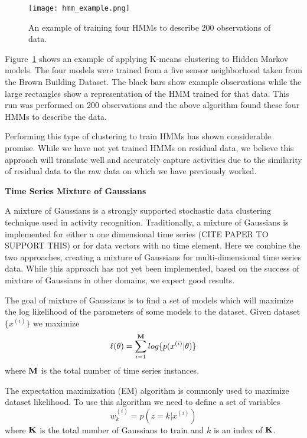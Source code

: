 \begin{figure}[t]
\begin{center}
\texttt{[image: hmm\_example.png]}
\end{center}
\caption{An example of training four HMMs to describe 200 observations of data.}
\label{fig:hmm_example}
\end{figure}

Figure~\ref{fig:hmm_example} shows an example of applying K-means clustering to Hidden Markov models.  The four models were trained from a five sensor neighborhood taken from the Brown Building Dataset.  The black bars show example observations while the large rectangles show a representation of the HMM trained for that data.  This run was performed on 200 observations and the above algorithm found these four HMMs to describe the data.  

Performing this type of clustering to train HMMs has shown considerable promise.  While we have not yet trained HMMs on residual data, we believe this approach will translate well and accurately capture activities due to the similarity of residual data to the raw data on which we have previously worked.\newline

\textbf{Time Series Mixture of Gaussians}

A mixture of Gaussians is a strongly supported stochastic data clustering technique used in activity recognition.  Traditionally, a mixture of Gaussians is implemented for either a one dimensional time series (CITE PAPER TO SUPPORT THIS) or for data vectors with no time element.  Here we combine the two approaches, creating a mixture of Gaussians for multi-dimensional time series data.  While this approach has not yet been implemented, based on the success of mixture of Gaussians in other domains, we expect good results.

The goal of mixture of Gaussians is to find a set of models which will maximize the log likelihood of the parameters of some models to the dataset.  Given dataset $\{x^{(i)}\}$ we maximize
\begin{equation}
\ell(\theta) = \sum_{i = 1}^{\bf M}log\{p(x^{(i)}|\theta)\}
\end{equation}
\noindent 
where ${\bf M}$ is the total number of time series instances.

The expectation maximization (EM) algorithm is commonly used to maximize dataset likelihood.  To use this algorithm we need to define a set of variables
\begin{equation}
w_{k}^{(i)} = p(z = k|x^{(i)})
\end{equation}
\noindent
where ${\bf K}$ is the total number of Gaussians to train and $k$ is an index of ${\bf K}$.  

